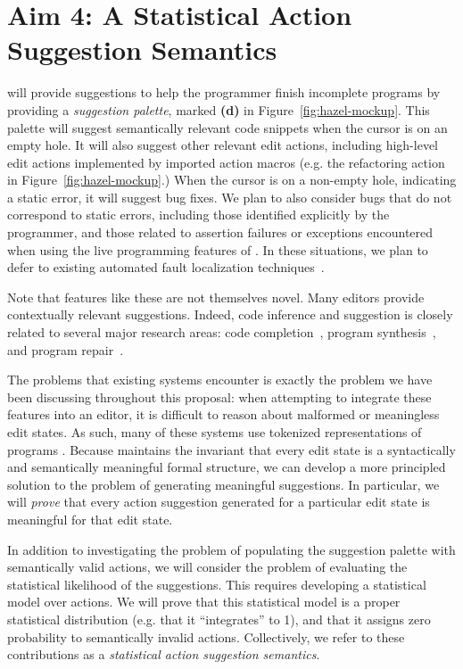\section{Aim 4: A Statistical Action Suggestion Semantics}
\label{sec:statistics}
\Hazel will provide suggestions to help the programmer finish incomplete
programs by providing a \emph{suggestion palette}, marked \textbf{(d)} in
Figure~\ref{fig:hazel-mockup}.  This palette will suggest semantically
relevant code  
snippets when the cursor is on an empty hole. It will also suggest other relevant
edit actions, including high-level edit actions implemented by imported action
macros (e.g. the refactoring action in Figure~\ref{fig:hazel-mockup}.)  When the
cursor is on a non-empty hole, indicating a static error, it will suggest
bug fixes. We plan to also consider bugs that do not correspond to static
errors, including those identified explicitly by the programmer, and those
related to assertion failures or exceptions encountered when using the live
programming features of \HazelEnv. In these situations, we plan to defer to
existing automated fault localization techniques~\cite{Jones02,
  Qi13issta,Renieris03}.

Note that features like these are not themselves novel. Many editors provide
contextually relevant suggestions. Indeed, code inference and suggestion is
closely related to several major research areas: code
completion~\cite{Muslu12icse-nier,icse-naturalness12}, program
synthesis~\cite{Gulwani2010}, and program
repair~\cite{legoues12tse,angelix,prophet,Ke15ase}.  

The problems that existing systems encounter is exactly the problem we have 
been discussing throughout this proposal: when attempting to integrate these 
features into an editor, it is difficult to reason about malformed or meaningless
edit states. As such, many of these systems use tokenized representations of programs \cite{icse-naturalness12}. Because \HazelEnv maintains the invariant that every
edit state is a syntactically and semantically meaningful formal structure, we can develop a
more principled solution to the problem of generating meaningful suggestions. In particular,
we will \emph{prove} that every action suggestion generated for a particular edit state is 
meaningful for that edit state.

In addition to investigating the problem of populating the suggestion palette
with semantically valid actions, we will consider the problem of evaluating
the statistical likelihood of the suggestions. This
requires developing a statistical model over actions.  We will prove that this statistical model is a
proper statistical distribution (e.g. that it ``integrates'' to 1), and that it
assigns zero probability to semantically invalid actions. Collectively, we refer 
to these contributions as a \emph{statistical action suggestion semantics}. 

